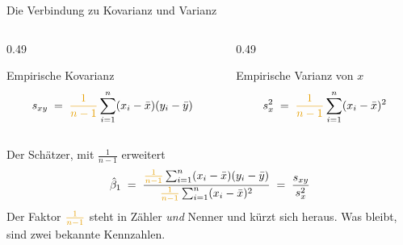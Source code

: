 \documentclass[aspectratio=169,11pt]{beamer}
\begin{document}
\begin{frame}{Die Verbindung zu Kovarianz und Varianz}
  \begin{columns}[T]
    \begin{column}{0.49\textwidth}
      \begin{block}{Empirische Kovarianz}
        \[
          s_{xy} \;=\; {\color{hsbiaccent}\frac{1}{n-1}}
          \sum_{i=1}^{n} (x_i - \bar{x})(y_i - \bar{y})
        \]
      \end{block}
    \end{column}
    \begin{column}{0.49\textwidth}
      \begin{block}{Empirische Varianz von $x$}
        \[
          s_x^{2} \;=\; {\color{hsbiaccent}\frac{1}{n-1}}
          \sum_{i=1}^{n} (x_i - \bar{x})^{2}
        \]
      \end{block}
    \end{column}
  \end{columns}

  \begin{block}{Der Schätzer, mit $\frac{1}{n-1}$ erweitert}
    \[
      \hat{\beta}_1
      \;=\;
      \frac{{\color{hsbiaccent}\frac{1}{n-1}}\sum_{i=1}^{n}(x_i-\bar{x})(y_i-\bar{y})}
           {{\color{hsbiaccent}\frac{1}{n-1}}\sum_{i=1}^{n}(x_i-\bar{x})^{2}}
      \;=\;
      \frac{s_{xy}}{s_x^{2}}
    \]
    Der Faktor ${\color{hsbiaccent}\frac{1}{n-1}}$ steht in Zähler \emph{und}
    Nenner und kürzt sich heraus. Was bleibt, sind zwei bekannte Kennzahlen.
  \end{block}
  \vspace{-8pt}
  \begin{center}
  \end{center}
\end{frame}
\end{document}
